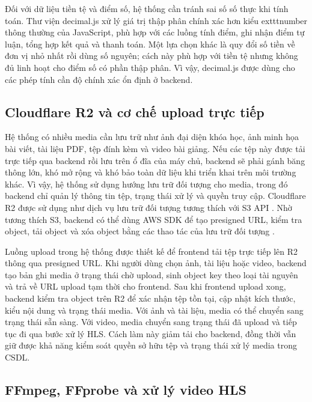 \documentclass[../DoAn.tex]{subfiles}
\begin{document}
Đối với dữ liệu tiền tệ và điểm số, hệ thống cần tránh sai số số thực khi tính toán. Thư viện decimal.js xử lý giá trị thập phân chính xác hơn kiểu 	exttt{number} thông thường của JavaScript, phù hợp với các luồng tính điểm, ghi nhận điểm tự luận, tổng hợp kết quả và thanh toán. Một lựa chọn khác là quy đổi số tiền về đơn vị nhỏ nhất rồi dùng số nguyên; cách này phù hợp với tiền tệ nhưng không đủ linh hoạt cho điểm số có phần thập phân. Vì vậy, decimal.js được dùng cho các phép tính cần độ chính xác ổn định ở backend.

\subsection{Cloudflare R2 và cơ chế upload trực tiếp}
\label{subsection:3.1.6}

Hệ thống có nhiều media cần lưu trữ như ảnh đại diện khóa học, ảnh minh họa bài viết, tài liệu PDF, tệp đính kèm và video bài giảng. Nếu các tệp này được tải trực tiếp qua backend rồi lưu trên ổ đĩa của máy chủ, backend sẽ phải gánh băng thông lớn, khó mở rộng và khó bảo toàn dữ liệu khi triển khai trên môi trường khác. Vì vậy, hệ thống sử dụng hướng lưu trữ đối tượng cho media, trong đó backend chỉ quản lý thông tin tệp, trạng thái xử lý và quyền truy cập. Cloudflare R2 được sử dụng như dịch vụ lưu trữ đối tượng tương thích với S3 API \cite{cloudflare_r2_docs}. Nhờ tương thích S3, backend có thể dùng AWS SDK để tạo presigned URL, kiểm tra object, tải object và xóa object bằng các thao tác của lưu trữ đối tượng \cite{aws_s3_docs}.

Luồng upload trong hệ thống được thiết kế để frontend tải tệp trực tiếp lên R2 thông qua presigned URL. Khi người dùng chọn ảnh, tài liệu hoặc video, backend tạo bản ghi media ở trạng thái chờ upload, sinh object key theo loại tài nguyên và trả về URL upload tạm thời cho frontend. Sau khi frontend upload xong, backend kiểm tra object trên R2 để xác nhận tệp tồn tại, cập nhật kích thước, kiểu nội dung và trạng thái media. Với ảnh và tài liệu, media có thể chuyển sang trạng thái sẵn sàng. Với video, media chuyển sang trạng thái đã upload và tiếp tục đi qua bước xử lý HLS. Cách làm này giảm tải cho backend, đồng thời vẫn giữ được khả năng kiểm soát quyền sở hữu tệp và trạng thái xử lý media trong CSDL.

\subsection{FFmpeg, FFprobe và xử lý video HLS}
\label{subsection:3.1.7}
\end{document}
